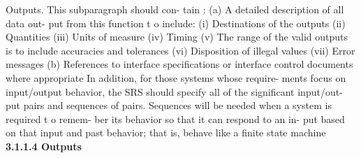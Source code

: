Outputs. This subparagraph should con-
tain :
(a) A detailed description of all data out-
put from this function t o include:
	(i) Destinations of the outputs
	(ii) Quantities
	(iii) Units of measure
	(iv) Timing
	(v) The range of the valid outputs is to
include accuracies and tolerances
	(vi) Disposition of illegal values
	(vii) Error messages
(b) References to interface specifications or
interface control documents where appropriate
In addition, for those systems whose require-
ments focus on input/output behavior, the SRS
should specify all of the significant input/out-
put pairs and sequences of pairs. Sequences will
be needed when a system is required t o remem-
ber its behavior so that it can respond to an in-
put based on that input and past behavior; that
is, behave like a finite state machine
\textbf{3.1.1.4 Outputs}




